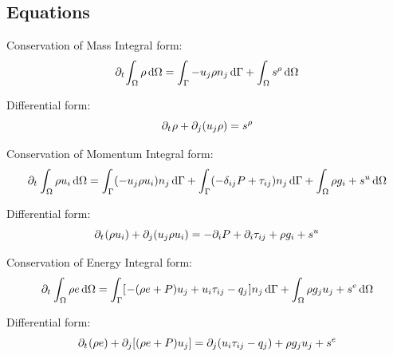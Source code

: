 \documentclass[10pt,t,xcolor=table,compress]{UWMadBeamer}
\begin{document}
    \subsection*{Equations}
    \begin{frame}{Conservation of Mass}
        Integral form:
        \begin{equation}%
            \pdt\!\IntV \rho \dV = \IntS -u_j \rho n_j\dS + \IntV s^{\rho}\dV
        \end{equation}
        
        Differential form:
        \begin{equation}%
            \pdt\rho + \pdj(u_j \rho)  =  s^{\rho}
        \end{equation}
    \end{frame}
    \begin{frame}{Conservation of Momentum}
        Integral form:
        \begin{equation}
            \pdt \IntV \rho u_i \dV = \IntS (-u_j \rho u_i) n_j \dS + \IntS (-\delta_{ij} P + \tau_{ij}) n_j \dS + \IntV \rho g_i + s^u \dV
        \end{equation}
        
        Differential form:
        \begin{equation}
            \pdt(\rho u_i) + \pdj(u_j \rho u_i) = -\pdi P + \pdi \tau_{ij} + \rho g_i + s^u
        \end{equation}
    \end{frame}
    \begin{frame}{Conservation of Energy}
        Integral form:
        \begin{equation}%
            \pdt \IntV \rho e \dV = \IntS \left[- (\rho{e} + P) u_j + u_i \tau_{ij} - q_j\right] n_j\dS + \IntV \rho g_j u_j + s^e\dV
        \end{equation}
        
        Differential form:
        \begin{equation}%
            \pdt(\rho e)+ \pdj[(\rho{e} + P) u_j] = \pdj(u_i \tau_{ij} - q_j) + \rho g_j u_j +  s^e
        \end{equation}
    \end{frame}
    
\end{document}
